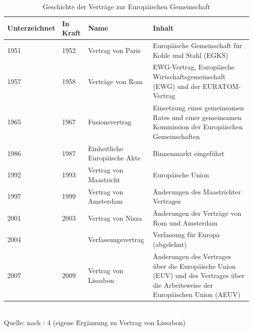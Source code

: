 \begin{table}[!hbt]\vspace{1ex}\centering
\caption{Geschichte der Verträge zur Europäischen Gemeinschaft}
\small
\begin{tabular}{|p{12mm}|p{12mm}|p{4cm}|p{7cm}|}\hline
Unter\-zeichnet &In Kraft & Name&Inhalt\\\hline
1951&1952&Vertrag von Paris&Europäische Gemeinschaft für Kohle und Stahl (EGKS)\\\hline
1957&1958&Verträge von Rom&EWG-Vertrag, Europäische Wirtschaftsgemeinschaft (EWG) und der EURATOM-Vertrag\\\hline
1965&1967&Fusionsvertrag&Einsetzung eines gemeinsamen Rates und einer gemeinsamen Kommission der Europäischen Gemeinschaften\\\hline
1986&1987&Einheitliche Europäische Akte&Binnenmarkt eingeführt\\\hline
1992&1993&Vertrag von Maastricht&Europäische Union\\\hline
1997&1999&Vertrag von Amsterdam&Änderungen des Maastrichter Vertrages\\\hline
2001&2003&Vertrag von Nizza&Änderungen der Verträge von Rom und Amsterdam\\\hline
2004& &Verfassungsvertrag&Verfassung für Europa (abgelehnt)\\\hline
2007&2009&Vertrag von Lissabon&Änderungen des Vertrages über die Europäische Union (EUV) und des Vertrages über die Arbeitsweise der Europäischen Union (AEUV)\\\hline
\end{tabular}\\
\scriptsize{Quelle: nach \cite{moller}: 4 (eigene Ergänzung zu Vertrag von Lissabon)}
\end{table}

